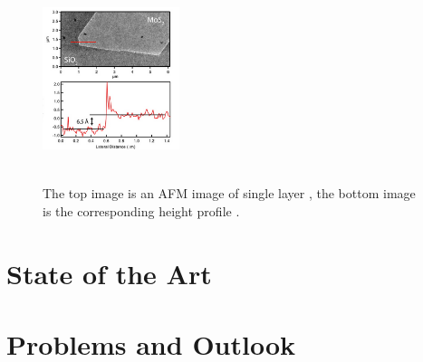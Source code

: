 \documentclass[%
 reprint,
 amsmath,amssymb,
 aps,
pra,
floatfix,
]{revtex4-1}
\begin{document}
\begin{figure}
\includegraphics[width=4cm,height=6cm]{../figs/mos2fetAFM}
\caption{The top image is an AFM image of single layer , the bottom image is the corresponding height profile \cite{Lembke2015}.}
\label{fig:mos2profile}
\end{figure}

\section{\label{sec:state_of_the_art} State of the Art}

\section{\label{sec:problems_and_outlook} Problems and Outlook}




\end{document}
